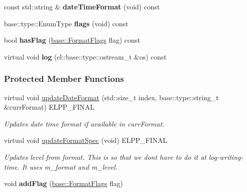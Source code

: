 \begin{DoxyCompactItemize}
\item 
\hypertarget{a00046_aa06b2643592f8a441d93cde673640262}{}const std\+::string \& {\bfseries date\+Time\+Format} (void) const \label{a00046_aa06b2643592f8a441d93cde673640262}

\item 
\hypertarget{a00046_a3ecf5f8df9b9e090784e19ad76046c49}{}base\+::type\+::\+Enum\+Type {\bfseries flags} (void) const \label{a00046_a3ecf5f8df9b9e090784e19ad76046c49}

\item 
\hypertarget{a00046_ae3634f9d90f7339d99eec8512b46c734}{}bool {\bfseries has\+Flag} (\hyperlink{a00184_a28939c5a884e67fcf12259f4b8848e00}{base\+::\+Format\+Flags} flag) const \label{a00046_ae3634f9d90f7339d99eec8512b46c734}

\item 
\hypertarget{a00046_a0cae595d1a367538243feb1be1555d2e}{}virtual void {\bfseries log} (el\+::base\+::type\+::ostream\+\_\+t \&os) const \label{a00046_a0cae595d1a367538243feb1be1555d2e}

\end{DoxyCompactItemize}
\subsubsection*{Protected Member Functions}
\begin{DoxyCompactItemize}
\item 
virtual void \hyperlink{a00046_a3146651eadd6b1164bde74e5b273ec94}{update\+Date\+Format} (std\+::size\+\_\+t index, base\+::type\+::string\+\_\+t \&curr\+Format) E\+L\+P\+P\+\_\+\+F\+I\+N\+A\+L
\begin{DoxyCompactList}\small\item\em Updates date time format if available in curr\+Format. \end{DoxyCompactList}\item 
\hypertarget{a00046_afee2335cce2b627dfd7f918d5a2b85f3}{}virtual void \hyperlink{a00046_afee2335cce2b627dfd7f918d5a2b85f3}{update\+Format\+Spec} (void) E\+L\+P\+P\+\_\+\+F\+I\+N\+A\+L\label{a00046_afee2335cce2b627dfd7f918d5a2b85f3}

\begin{DoxyCompactList}\small\item\em Updates level from format. This is so that we dont have to do it at log-\/writing-\/time. It uses m\+\_\+format and m\+\_\+level. \end{DoxyCompactList}\item 
\hypertarget{a00046_ae55910f533a6eb3b41eb75b131e522bf}{}void {\bfseries add\+Flag} (\hyperlink{a00184_a28939c5a884e67fcf12259f4b8848e00}{base\+::\+Format\+Flags} flag)\label{a00046_ae55910f533a6eb3b41eb75b131e522bf}

\end{DoxyCompactItemize}
